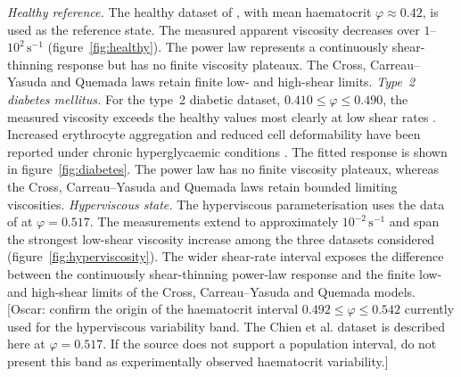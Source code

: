\documentclass[lineno]{jfm}
\begin{document}
\medskip
\noindent\textit{Healthy reference.}
The healthy dataset of \citet{cho2008hemorheological}, with mean haematocrit
$\varphi\approx0.42$, is used as the reference state. The measured apparent
viscosity decreases over
$1$--$10^2\,\mathrm{s}^{-1}$
(figure~\ref{fig:healthy}). The power law represents a continuously
shear-thinning response but has no finite viscosity plateaux. The Cross,
Carreau--Yasuda and Quemada laws retain finite low- and high-shear limits.
\medskip
\noindent\textit{Type~2 diabetes mellitus.}
For the type~2 diabetic dataset,
$0.410\leq\varphi\leq0.490$, the measured viscosity exceeds the healthy values
most clearly at low shear rates \citep{cho2008hemorheological}. Increased
erythrocyte aggregation and reduced cell deformability have been reported under
chronic hyperglycaemic conditions \citep{Sun2022}. The fitted response is shown
in figure~\ref{fig:diabetes}. The power law has no finite viscosity plateaux,
whereas the Cross, Carreau--Yasuda and Quemada laws retain bounded limiting
viscosities.
\medskip
\noindent\textit{Hyperviscous state.}
The hyperviscous parameterisation uses the data of \citet{Chien1966} at
$\varphi=0.517$. The measurements extend to approximately
$10^{-2}\,\mathrm{s}^{-1}$ and span the strongest low-shear viscosity increase
among the three datasets considered
(figure~\ref{fig:hyperviscosity}). The wider shear-rate interval exposes the
difference between the continuously shear-thinning power-law response and the
finite low- and high-shear limits of the Cross, Carreau--Yasuda and Quemada
models.
{\color{red}[Oscar: confirm the origin of the haematocrit interval
$0.492\leq\varphi\leq0.542$ currently used for the hyperviscous variability
band. The Chien et al. dataset is described here at $\varphi=0.517$. If the
source does not support a population interval, do not present this band as
experimentally observed haematocrit variability.]}
\end{document}

